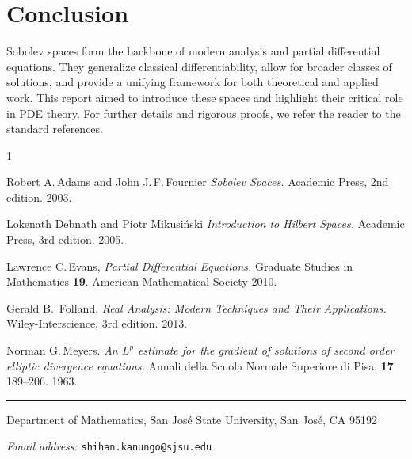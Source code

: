 \documentclass[12pt,letterpaper,reqno]{article}
\theoremstyle{plain}                              %
\theoremstyle{definition}                         %
\theoremstyle{remark}                             %
\numberwithin{equation}{section}
\begin{document}
\section*{Conclusion}
Sobolev spaces form the backbone of modern analysis and partial differential equations. They generalize classical differentiability, allow for broader classes of solutions, and provide a unifying framework for both theoretical and applied work. This report aimed to introduce these spaces and highlight their critical role in PDE theory. For further details and rigorous proofs, we refer the reader to the standard references.



\vspace{10mm}%


\begin{thebibliography}{1}

Robert A.\,Adams and John J.\,F.\,Fournier {\it Sobolev Spaces.} Academic Press, 2nd edition. 2003. \vskip 5pt

Lokenath Debnath and Piotr Mikusi\'nski {\it Introduction to Hilbert Spaces.} Academic Press, 3rd edition. 2005.

Lawrence C.\,Evans, {\it Partial Differential Equations.} Graduate Studies in Mathematics \textbf{19}.  American Mathematical Society 2010. \vskip 5pt

Gerald B.~Folland, {\it Real Analysis: Modern Techniques and Their Applications.} Wiley-Interscience, 3rd edition. 2013.

Norman G.\,Meyers. {\it An \(L^p\) estimate for the gradient of solutions of second order elliptic divergence equations.} Annali della Scuola Normale Superiore di Pisa, \textbf{17}  189--206.  1963. 
\end{thebibliography}

\vfill

\rule{5cm}{1pt}

{\footnotesize \sc Department of Mathematics, San Jos\'e State University, San Jos\'e, CA 95192}


{\footnotesize \em Email address: } \texttt{\small shihan.kanungo@sjsu.edu}
\end{document}
